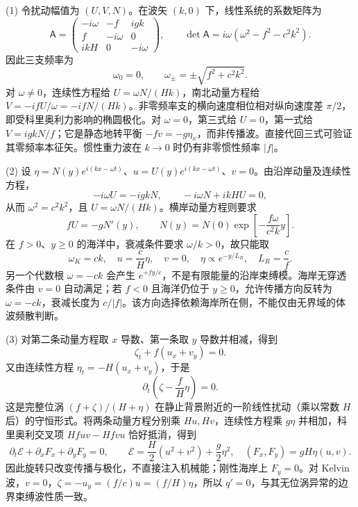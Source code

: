 (1) 令扰动幅值为 \((U,V,N)\)。在波矢 \((k,0)\) 下，线性系统的系数矩阵为
\[
\mathsf A=\begin{pmatrix}
-i\omega&-f&igk\\ f&-i\omega&0\\ ikH&0&-i\omega
\end{pmatrix},\qquad
\det\mathsf A=i\omega(\omega^2-f^2-c^2k^2).
\]
因此三支频率为
\[
\boxed{\omega_0=0,\qquad \omega_\pm=\pm\sqrt{f^2+c^2k^2}}.
\]
对 \(\omega\ne0\)，连续性方程给 \(U=\omega N/(Hk)\)，南北动量方程给
\(V=-ifU/\omega=-ifN/(Hk)\)。非零频率支的横向速度相位相对纵向速度差 \(\pi/2\)，即受科里奥利力影响的椭圆极化。对 \(\omega=0\)，第三式给 \(U=0\)，第一式给 \(V=igkN/f\)；它是静态地转平衡 \(-fv=-g\eta_x\)，而非传播波。直接代回三式可验证其零频率本征矢。惯性重力波在 \(k\to0\) 时仍有非零惯性频率 \(|f|\)。

(2) 设 \(\eta=N(y)e^{i(kx-\omega t)}\)、\(u=U(y)e^{i(kx-\omega t)}\)、\(v=0\)。由沿岸动量及连续性方程，
\[
-i\omega U=-igkN,\qquad -i\omega N+ikHU=0,
\]
从而 \(\omega^2=c^2k^2\)，且 \(U=\omega N/(Hk)\)。横岸动量方程则要求
\[
fU=-gN'(y),\qquad
N(y)=N(0)\exp\!\left[-\frac{f\omega}{c^2k}y\right].
\]
在 \(f>0\)、\(y\ge0\) 的海洋中，衰减条件要求 \(\omega/k>0\)，故只能取
\[
\boxed{\omega_K=ck,\quad u=\frac cH\eta,\quad v=0,\quad
\eta\propto e^{-y/L_R},\quad L_R=\frac cf}.
\]
另一个代数根 \(\omega=-ck\) 会产生 \(e^{+fy/c}\)，不是有限能量的沿岸束缚模。海岸无穿透条件由 \(v=0\) 自动满足；若 \(f<0\) 且海洋仍位于 \(y\ge0\)，允许传播方向反转为 \(\omega=-ck\)，衰减长度为 \(c/|f|\)。该方向选择依赖海岸所在侧，不能仅由无界域的体波频散判断。

(3) 对第二条动量方程取 \(x\) 导数、第一条取 \(y\) 导数并相减，得到
\[
\zeta_t+f(u_x+v_y)=0.
\]
又由连续性方程 \(\eta_t=-H(u_x+v_y)\)，于是
\[
\boxed{\partial_t\left(\zeta-\frac fH\eta\right)=0}.
\]
这是完整位涡 \((f+\zeta)/(H+\eta)\) 在静止背景附近的一阶线性扰动（乘以常数 \(H\) 后）的守恒形式。将两条动量方程分别乘 \(Hu,Hv\)，连续性方程乘 \(g\eta\) 并相加，科里奥利交叉项 \(Hfuv-Hfvu\) 恰好抵消，得到
\[
\boxed{\partial_t\mathcal E+\partial_xF_x+\partial_yF_y=0},\qquad
\mathcal E=\frac H2(u^2+v^2)+\frac g2\eta^2,\quad
(F_x,F_y)=gH\eta(u,v).
\]
因此旋转只改变传播与极化，不直接注入机械能；刚性海岸上 \(F_y=0\)。对 Kelvin 波，\(v=0\)，\(\zeta=-u_y=(f/c)u=(f/H)\eta\)，所以 \(\boxed{q'=0}\)，与其无位涡异常的边界束缚波性质一致。

